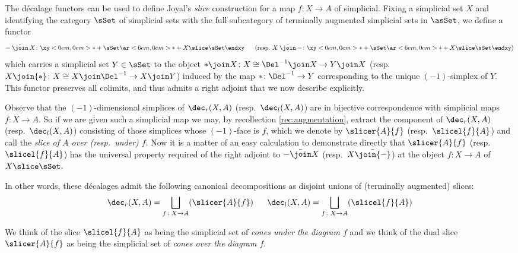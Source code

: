   \begin{defn}\label{defn:slices}
The d{\'e}calage functors can be used to define Joyal's \emph{slice} construction for a map $f\colon X\to A$ of simplicial. 
Fixing a simplicial set $X$ and identifying the category $\sSet$  of simplicial sets with the full subcategory of terminally augmented simplicial sets in $\asSet$, we define a functor
    \begin{equation*}
      {-}\mathbin{\bar\join} X\colon \xy<0em,0em>*+{\sSet}\ar <6em,0em>*+{X\slice\sSet}\endxy\mkern30mu
      (\text{resp.\ } 
      X\mathbin{\bar\join}{-}\colon \xy<0em,0em>*+{\sSet}\ar <6em,0em>*+{X\slice\sSet}\endxy)
    \end{equation*}
    which carries a simplicial set $Y\in\sSet$ to the object ${*}\join X\colon X\cong\Del^{-1}\join X\to Y\join X$ (resp.\ $X\join{*}\colon X\cong X\join\Del^{-1} \to X\join Y$) induced by the map ${*}\colon\Del^{-1}\to Y$ corresponding to the unique $(-1)$-simplex of $Y$. This functor preserves all colimits, and thus admits a right adjoint that we now describe explicitly.
    
Observe that the $(-1)$-dimensional simplices of $\dec_r(X, A)$ (resp.\ $\dec_l(X,A)$) are in bijective correspondence with simplicial maps $f\colon X\to A$. So if we are given such a simplicial map we may, by recollection \ref{rec:augmentation}, extract the component of $\dec_r(X,A)$ (resp.\ $\dec_l(X,A)$) consisting of those simplices whose $(-1)$-face is $f$, which we denote by $\slicer{A}{f}$ (resp.\ $\slicel{f}{A}$) and call the {\em slice of $A$ over (resp.\ under) $f$}. Now it is a matter of an easy calculation to demonstrate directly that $\slicer{A}{f}$ (resp. $\slicel{f}{A}$) has the universal property required of the right adjoint to ${-}\bar\join X$ (resp.\ $X\bar\join {-}$) at the object $f\colon X\to A$ of $X\slice\sSet$.

    In other words, these d{\'e}calages admit the following canonical decompositions as disjoint unions of (terminally augmented) slices: 
    \begin{equation*}
      \dec_r(X,A)=\bigsqcup_{f\colon X\to A} (\slicer{A}{f})\mkern30mu
      \dec_l(X,A)=\bigsqcup_{f\colon X\to A} (\slicel{f}{A})
    \end{equation*}

    We think of the slice $\slicel{f}{A}$ as being the simplicial set of {\em cones under the diagram $f$\/} and we think of the dual slice $\slicer{A}{f}$ as being the simplicial set of {\em cones over the diagram $f$}.
  \end{defn}
  
